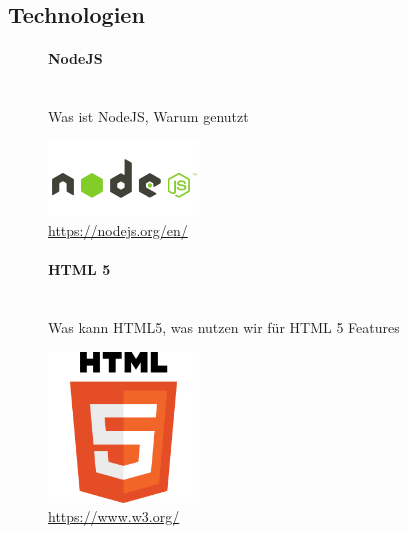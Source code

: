 \documentclass[a4paper]{spie}  %
\begin{document}
\subsection{Technologien} %
\begin{figure}[H]
\begin{minipage}[t]{0.4\textwidth}
\vspace{0pt}
\paragraph{NodeJS}\mbox{}\\
Was ist NodeJS, Warum genutzt
\end{minipage}
\hfill
\begin{minipage}[t]{0.5\textwidth}
\vspace{0pt}
		\includegraphics[width=4cm, right]{./images/software/1436439824nodejs-logo}
		\caption{\url{https://nodejs.org/en/}}
		\label{fig:test2}
\end{minipage}
\end{figure}

\begin{figure}[H]
\begin{minipage}[t]{0.4\textwidth}
\vspace{0pt}
\paragraph{HTML 5}\mbox{}\\
Was kann HTML5, was nutzen wir für HTML 5 Features
\end{minipage}
\hfill
\begin{minipage}[t]{0.5\textwidth}
\vspace{0pt}
		\includegraphics[width=4cm, right]{./images/software/HTML5_Logo_512}
		\caption{\url{https://www.w3.org/}}
		\label{fig:test2}
\end{minipage}
\end{figure}
\end{document}
